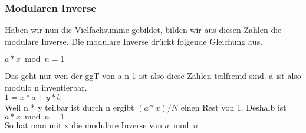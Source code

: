 \subsubsection{Modularen Inverse}
Haben wir nun die Vielfachsumme gebildet, bilden wir aus diesen Zahlen die modulare Inverse. Die modulare Inverse drückt folgende Gleichung aus.
\begin{center}
$ a * x \bmod n = 1  $\\
\end{center}
Das geht nur wen der ggT von a n 1 ist also diese Zahlen teilfremd sind. a ist also modulo n inventierbar.\\
$ 1 = x*a + y*b $\\
Weil n * y teilbar ist durch n ergibt $ (a * x) / N $ einen Rest von 1. Deshalb ist \\
$ a * x \bmod n = 1  $\\
So hat man mit x die modulare Inverse von $ a \bmod n $

